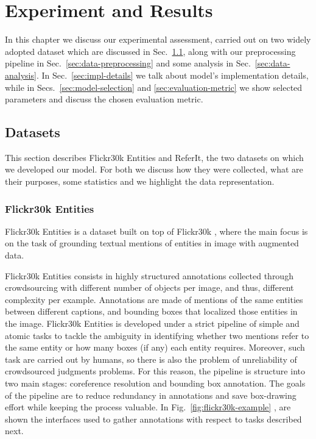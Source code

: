 
\chapter{Experiment and Results}
\label{ch:experiments}

In this chapter we discuss our experimental assessment, carried out on
two widely adopted dataset which are discussed in
Sec.~\ref{sec:datasets}, along with our preprocessing pipeline in
Sec.~\ref{sec:data-preprocessing} and some analysis in
Sec.~\ref{sec:data-analysis}. In Sec.~\ref{sec:impl-details} we talk
about model's implementation details, while in
Secs.~\ref{sec:model-selection} and \ref{sec:evaluation-metric} we
show selected parameters and discuss the chosen evaluation metric.

\section{Datasets}
\label{sec:datasets}

This section describes Flickr30k Entities and ReferIt, the two
datasets on which we developed our model. For both we discuss how they
were collected, what are their purposes, some statistics and we
highlight the data representation.

\subsection{Flickr30k Entities}
\label{subsec:flickr30k}

Flickr30k Entities \cite{plummer2015flickr30k} is a dataset built on
top of Flickr30k \cite{young2014image}, where the main focus is on the
task of grounding textual mentions of entities in image with augmented
data.

Flickr30k Entities consists in highly structured annotations collected
through crowdsourcing with different number of objects per image, and
thus, different complexity per example. Annotations are made of
mentions of the same entities between different captions, and bounding
boxes that localized those entities in the image. Flickr30k Entities
is developed under a strict pipeline of simple and atomic tasks to
tackle the ambiguity in identifying whether two mentions refer to the
same entity or how many boxes (if any) each entity requires. Moreover,
such task are carried out by humans, so there is also the problem of
unreliability of crowdsourced judgments problems. For this reason, the
pipeline is structure into two main stages: coreference resolution and
bounding box annotation. The goals of the pipeline are to reduce
redundancy in annotations and save box-drawing effort while keeping
the process valuable. In Fig.~\ref{fig:flickr30k-example}
\cite{plummer2015flickr30k}, are shown the interfaces used to gather
annotations with respect to tasks described next.

